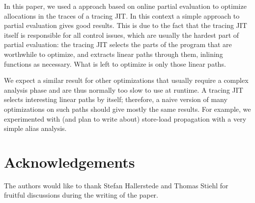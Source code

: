 \documentclass{sigplanconf}
\begin{document}
In this paper, we used a approach based on online partial evaluation to
optimize allocations in the traces of a tracing JIT.  In this context a
simple approach to partial evaluation gives good results.  This is due
to the fact that the tracing JIT itself is responsible for all control
issues, which are usually the hardest part of partial evaluation: the
tracing JIT selects the parts of the program that are worthwhile to
optimize, and extracts linear paths through them, inlining functions as
necessary.  What is left to optimize is only those linear paths.

We expect a similar result for other optimizations that usually require
a complex analysis phase and are thus normally too slow to use at
runtime.  A tracing JIT selects interesting linear paths by itself;
therefore, a naive version of many optimizations on such paths should
give mostly the same results.  For example, we experimented with (and
plan to write about) store-load propagation with a very simple alias
analysis.


\section*{Acknowledgements}

The authors would like to thank Stefan Hallerstede and Thomas Stiehl for
fruitful discussions during the writing of the paper.



\end{document}
